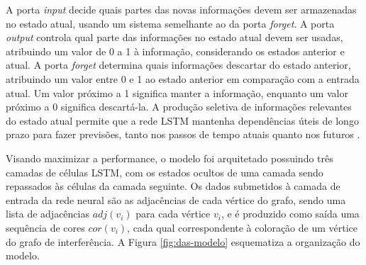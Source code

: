 \documentclass[
	12pt,				%
	openright,			%
	twoside,			%
	a4paper,			%
	tcc,			%
	]{ABNT-DC-UEL}
\begin{document}
A porta \textit{input} decide quais partes das novas informações devem ser armazenadas no estado atual, usando um sistema semelhante ao da porta \textit{forget}. A porta \textit{output} controla qual parte das informações no estado atual devem ser usadas, atribuindo um valor de 0 a 1 à informação, considerando os estados anterior e atual. A porta \textit{forget} determina quais informações descartar do estado anterior, atribuindo um valor entre 0 e 1 ao estado anterior em comparação com a entrada atual. Um valor próximo a 1 significa manter a informação, enquanto um valor próximo a 0 significa descartá-la. A produção seletiva de informações relevantes do estado atual permite que a rede LSTM mantenha dependências úteis de longo prazo para fazer previsões, tanto nos passos de tempo atuais quanto nos futuros \cite{yu:19, das:20}.

Visando maximizar a performance, o modelo foi arquitetado possuindo três camadas de células LSTM, com os estados ocultos de uma camada sendo repassados às células da camada seguinte. Os dados submetidos à camada de entrada da rede neural são as adjacências de cada vértice do grafo, sendo uma lista de adjacências $\mathit{adj}(v_i)$ para cada vértice $v_i$, e é produzido como saída uma sequência de cores $\mathit{cor}(v_i)$, cada qual correspondente à coloração de um vértice do grafo de interferência. A Figura \ref{fig:das-modelo} esquematiza a organização do modelo.
\end{document}
